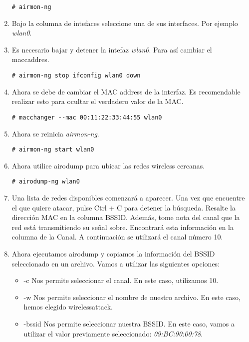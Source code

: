 \documentclass[11pt,a4paper]{scrartcl}			%
\begin{document}
\begin{multicols*}{2}
\begin{enumerate}
\begin{verbatim}
# airmon-ng
\end{verbatim}

\item Bajo la columna de intefaces seleccione una de sus interfaces. Por ejemplo \textit{wlan0}. 

\item Es necesario bajar y detener la intefaz \textit{wlan0}. Para así cambiar el maccaddres.

\begin{verbatim}
# airmon-ng stop ifconfig wlan0 down
\end{verbatim}

\item Ahora se debe de cambiar el MAC address de la interfaz. Es recomendable realizar esto para ocultar el verdadero valor de la MAC.

\begin{verbatim}
# macchanger --mac 00:11:22:33:44:55 wlan0
\end{verbatim}

\item Ahora se reinicia \textit{airmon-ng}.

\begin{verbatim}
# airmon-ng start wlan0
\end{verbatim}

\item Ahora utilice airodump para ubicar las redes wireless cercanas.


\begin{verbatim}
# airodump-ng wlan0
\end{verbatim}

\item Una lista de redes disponibles comenzará a aparecer. Una vez que encuentre el que quiere atacar, pulse Ctrl + C para detener la búsqueda. Resalte la dirección MAC en la columna BSSID. Además, tome nota del canal que la red está transmitiendo su señal sobre. Encontrará esta información en la columna de la Canal. A continuación se utilizará el canal número 10.

\item Ahora ejecutamos airodump y copiamos la información del BSSID seleccionado en un archivo. Vamos a utilizar las siguientes opciones:

\begin{itemize}
\item -c Nos permite seleccionar el canal. En este caso, utilizamos 10.
\item -w Nos permite seleccionar el nombre de nuestro archivo. En este caso, hemos elegido wirelessattack.
\item -bssid Nos permite seleccionar nuestra BSSID. En este caso, vamos a utilizar el valor previamente seleccionado: \textit{09:BC:90:00:78}.
\end{itemize}


\end{enumerate}
\end{multicols*}
\end{document}
